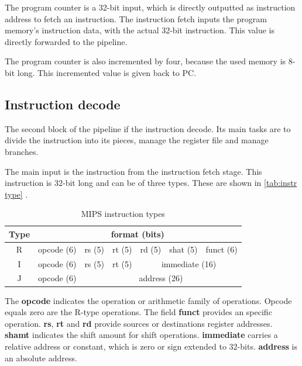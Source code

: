 The program counter is a 32-bit input, which is directly outputted as instruction address to fetch an instruction. The instruction fetch inputs the program memory's instruction data, 
with the actual 32-bit instruction. This value is directly forwarded to the pipeline.

The program counter is also incremented by four, because the used memory is 8-bit long. This incremented value is given back to PC.
\subsection{Instruction decode}
The second block of the pipeline if the instruction decode. Its main tasks are to divide the instruction into its pieces, manage the register file and manage branches.

The main input is the instruction from the instruction fetch stage. This instruction is 32-bit long and can be of three types. These are shown in \autoref{tab:instr type} \cite{mips32}.

\begin{table}[h!]
	\centering
	 \caption{MIPS instruction types}	
	\begin{tabular}{ccccccc}
		\toprule[2pt]
		\textbf{Type} & \multicolumn{6}{c}{\textbf{format (bits) }}   \\
		\toprule[2pt]
		R & opcode (6) & rs (5) & rt (5)   & rd (5) & shat (5) & funct (6) \\
		I & opcode (6) & rs (5) & rt (5)   & \multicolumn{3}{c}{ immediate (16)} \\
		J & opcode (6) & \multicolumn{5}{c}{ address (26)} \\	
		\bottomrule[2pt]
	\end{tabular} 
	\label{tab:instr type}
\end{table}

The \textbf{opcode} indicates the operation or arithmetic family of operations. Opcode equals zero are the R-type operations. The field \textbf{funct} provides an specific operation.
\textbf{rs}, \textbf{rt} and \textbf{rd} provide sources or destinations register addresses. \textbf{shamt} indicates the shift amount for shift operations. \textbf{immediate} carries
a relative address or constant, which is zero or sign extended to 32-bits. \textbf{address} is an absolute address.

